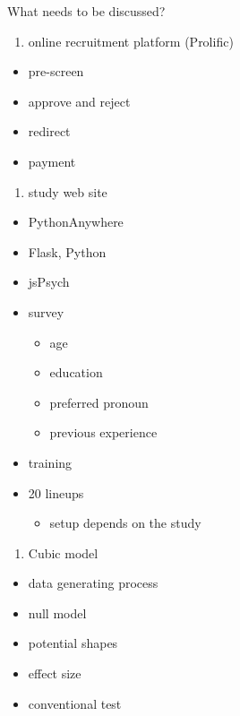 \documentclass{monashthesis}
\begin{document}
What needs to be discussed?

\begin{enumerate}
\def\labelenumi{\arabic{enumi}.}
\tightlist
\item
  online recruitment platform (Prolific)
\end{enumerate}

\begin{itemize}
\tightlist
\item
  pre-screen
\item
  approve and reject
\item
  redirect
\item
  payment
\end{itemize}

\begin{enumerate}
\def\labelenumi{\arabic{enumi}.}
\setcounter{enumi}{1}
\tightlist
\item
  study web site
\end{enumerate}

\begin{itemize}
\tightlist
\item
  PythonAnywhere
\item
  Flask, Python
\item
  jsPsych
\item
  survey

  \begin{itemize}
  \tightlist
  \item
    age
  \item
    education
  \item
    preferred pronoun
  \item
    previous experience
  \end{itemize}
\item
  training
\item
  20 lineups

  \begin{itemize}
  \tightlist
  \item
    setup depends on the study
  \end{itemize}
\end{itemize}

\begin{enumerate}
\def\labelenumi{\arabic{enumi}.}
\setcounter{enumi}{2}
\tightlist
\item
  Cubic model
\end{enumerate}

\begin{itemize}
\tightlist
\item
  data generating process
\item
  null model
\item
  potential shapes
\item
  effect size
\item
  conventional test
\end{itemize}
\end{document}
